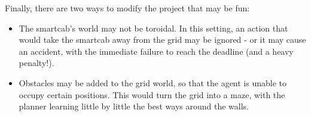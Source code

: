 \documentclass{article}
\begin{document}
Finally, there are two ways to modify the project that may be fun:
\begin{itemize}
    \item The smartcab's world may not be toroidal. In this setting, an action that would take the smartcab away from the grid may be ignored - or it may cause an accident, with the immediate failure to reach the deadline (and a heavy penalty!).
    \item Obstacles may be added to the grid world, so that the agent is unable to occupy certain positions. This would turn the grid into a maze, with the planner learning little by little the best ways around the walls.
\end{itemize}
\end{document}
